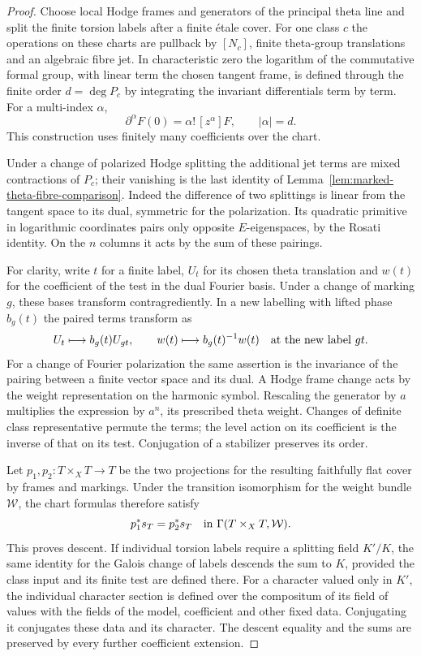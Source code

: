 \begin{proof}
Choose local Hodge frames and generators of the principal theta line
and split the finite torsion labels after a finite \'etale cover.
For one class \(c\) the operations on these charts are pullback by
\([N_c]\), finite theta-group translations and an algebraic fibre
jet. In characteristic zero the logarithm of the commutative
formal group, with linear term the chosen tangent frame, is defined
through the finite order \(d=\deg P_c\) by integrating the invariant
differentials term by term. For a multi-index \(\alpha\),
\[
    \partial^\alpha F(0)=\alpha!\,[z^\alpha]F,\qquad |\alpha|=d .
\]
This construction uses finitely many coefficients over the chart.

Under a change of polarized Hodge splitting the additional jet
terms are mixed contractions of \(P_c\); their vanishing is the
last identity of Lemma~\ref{lem:marked-theta-fibre-comparison}.
Indeed the difference of two splittings is linear from the tangent
space to its dual, symmetric for the polarization. Its quadratic
primitive in logarithmic coordinates pairs only opposite
\(E\)-eigenspaces, by the Rosati identity. On the \(n\) columns
it acts by the sum of these pairings.

For clarity, write \(t\) for a finite label, \(U_t\) for its chosen
theta translation and \(w(t)\) for the coefficient of the test in
the dual Fourier basis. Under a change of marking \(g\), these
bases transform contragrediently. In a new labelling with lifted
phase \(b_g(t)\) the paired terms transform as
\[
      U_t\longmapsto b_g(t)U_{g t},\qquad
      w(t)\longmapsto b_g(t)^{-1}w(t)
                 \quad\hbox{at the new label }g t .
\]
For a change of Fourier polarization the same assertion is the
invariance of the pairing between a finite vector space and its
dual. A Hodge frame change acts by the weight representation on the
harmonic symbol. Rescaling the generator by \(a\) multiplies the
expression by \(a^n\), its prescribed theta weight. Changes of
definite class representative permute the terms; the level action
on its coefficient is the inverse of that on its test. Conjugation
of a stabilizer preserves its order.

Let \(p_1,p_2:T\times_X T\to T\) be the two projections for the
resulting faithfully flat cover by frames and markings. Under the
transition isomorphism for the weight bundle \(\mathcal W\), the
chart formulas therefore satisfy
\[
           p_1^*s_T=p_2^*s_T
                 \quad\hbox{in }\Gamma(T\times_X T,\mathcal W).
\]
This proves descent. If individual torsion labels require a splitting
field \(K'/K\), the same identity for the Galois change of labels
descends the sum to \(K\), provided the class input and its finite
test are defined there. For a character valued only in \(K'\), the
individual character section is defined over the compositum of its
field of values with the fields of the model, coefficient and other
fixed data. Conjugating it conjugates these data and its character. The descent equality
and the sums are preserved by every further coefficient extension.
\end{proof}

